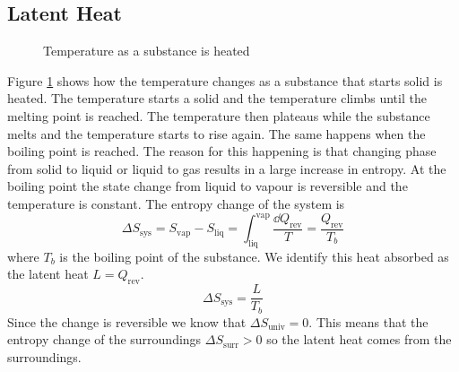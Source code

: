 \documentclass{article}
\begin{document}
    \subsection{Latent Heat}
    \begin{figure}[ht]
        \centering
        \caption{Temperature as a substance is heated}
        \label{fig:latent heat}
    \end{figure}
    Figure \ref{fig:latent heat} shows how the temperature changes as a substance that starts solid is heated.
    The temperature starts a solid and the temperature climbs until the melting point is reached.
    The temperature then plateaus while the substance melts and the temperature starts to rise again.
    The same happens when the boiling point is reached.
    The reason for this happening is that changing phase from solid to liquid or liquid to gas results in a large increase in entropy.
    At the boiling point the state change from liquid to vapour is reversible and the temperature is constant.
    The entropy change of the system is
    \[\Delta S_\text{sys} = S_\text{vap} - S_\text{liq} = \int_{\text{liq}}^{\text{vap}}\frac{\dd Q_\text{rev}}{T} = \frac{Q_\text{rev}}{T_b}\]
    where \(T_b\) is the boiling point of the substance.
    We identify this heat absorbed as the latent heat \(L = Q_\text{rev}\).
    \[\Delta S_\text{sys} = \frac{L}{T_b}\]
    Since the change is reversible we know that \(\Delta S_\text{univ} = 0\).
    This means that the entropy change of the surroundings \(\Delta S_\text{surr} > 0\) so the latent heat comes from the surroundings.
    
\end{document}
